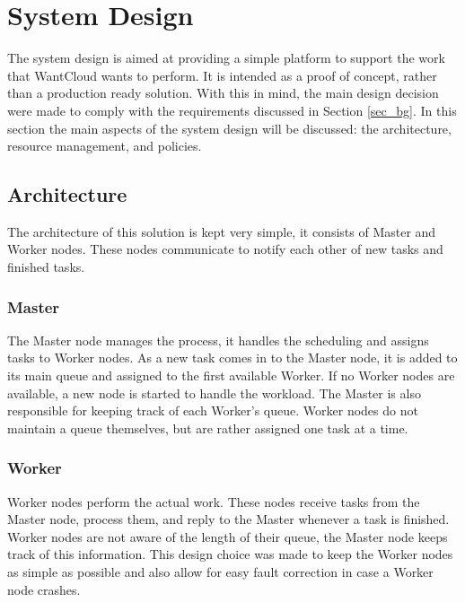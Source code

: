 \documentclass{acm_proc_article-sp}
\begin{document}
\section{System Design}
\label{sec_system}
The system design is aimed at providing a simple platform to support the work that WantCloud wants to perform.
It is intended as a proof of concept, rather than a production ready solution.
With this in mind, the main design decision were made to comply with the requirements discussed in Section \ref{sec_bg}.
In this section the main aspects of the system design will be discussed: the architecture, resource management, and policies.

\subsection{Architecture}
The architecture of this solution is kept very simple, it consists of Master and Worker nodes.
These nodes communicate to notify each other of new tasks and finished tasks.

\subsubsection{Master}
The Master node manages the process, it handles the scheduling and assigns tasks to Worker nodes.
As a new task comes in to the Master node, it is added to its main queue and assigned to the first available Worker.
If no Worker nodes are available, a new node is started to handle the workload.
The Master is also responsible for keeping track of each Worker's queue.
Worker nodes do not maintain a queue themselves, but are rather assigned one task at a time.

\subsubsection{Worker}
Worker nodes perform the actual work.
These nodes receive tasks from the Master node, process them, and reply to the Master whenever a task is finished.
Worker nodes are not aware of the length of their queue, the Master node keeps track of this information.
This design choice was made to keep the Worker nodes as simple as possible and also allow for easy fault correction in case a Worker node crashes.
\end{document}
